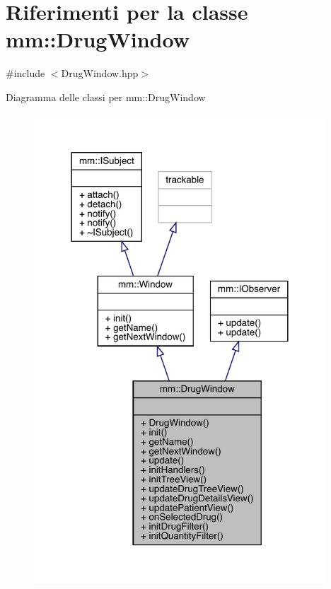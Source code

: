 \hypertarget{classmm_1_1_drug_window}{}\section{Riferimenti per la classe mm\+:\+:Drug\+Window}
\label{classmm_1_1_drug_window}


{\ttfamily \#include $<$Drug\+Window.\+hpp$>$}



Diagramma delle classi per mm\+:\+:Drug\+Window
\nopagebreak
\begin{figure}[H]
\begin{center}
\leavevmode
\includegraphics[width=309pt]{d6/d16/classmm_1_1_drug_window__inherit__graph}
\end{center}
\end{figure}


